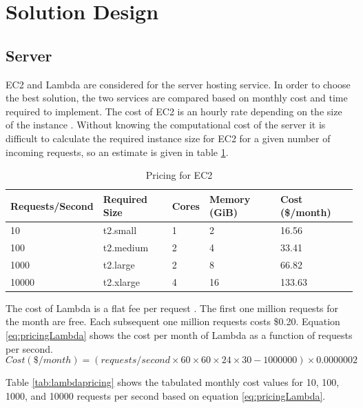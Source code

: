 \documentclass[letterpaper,12pt]{article}
\begin{document}

\section{Solution Design}
\subsection{Server}
EC2 and Lambda are considered for the server hosting service. In order to choose the best solution, the two services are compared based on monthly cost and time required to implement. The cost of EC2 is an hourly rate depending on the size of the instance \cite{ec2}. Without knowing the computational cost of the server it is difficult to calculate the required instance size for EC2 for a given number of incoming requests, so an estimate is given in table \ref{tab:ec2pricing}.

\begin{table}[H]
	\begin{center}
		\caption{Pricing for EC2}
        \label{tab:ec2pricing}
        \begin{tabular}{l|l|l|l|l}
        Requests/Second & Required Size & Cores & Memory (GiB) & Cost (\$/month)\\
        \hline
        10 & t2.small & 1 & 2 & 16.56\\
        100 & t2.medium & 2 & 4 & 33.41\\
        1000 & t2.large & 2 & 8 & 66.82\\
        10000 & t2.xlarge & 4 & 16 & 133.63\\
        \end{tabular}
	\end{center}
\end{table}

The cost of Lambda is a flat fee per request \cite{lambda}. The first one million requests for the month are free. Each subsequent one million requests costs \$0.20. Equation \ref{eq:pricingLambda} shows the cost per month of Lambda as a function of requests per second.
\begin{equation}
\label{eq:pricingLambda}
Cost (\$/month) = (requests/second\times60\times60\times24\times30-1000000)\times0.0000002
\end{equation}

Table \ref{tab:lambdapricing} shows the tabulated monthly cost values for 10, 100, 1000, and 10000 requests per second based on equation \ref{eq:pricingLambda}. 
\end{document}
